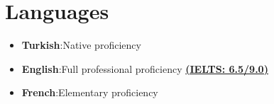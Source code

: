 \documentclass[a4paper,11pt]{article}
\newcommand{\resumeItem}[2]{
    \item{\textbf{#1}{:\hspace{0.5mm}#2 \vspace{-0.5mm}}}
}
\newcommand{\resumeSubItem}[2]{\resumeItem{#1}{#2}\vspace{-4pt}}
\newcommand{\resumeHeadingSkillStart}{\begin{itemize}[leftmargin=*,itemsep=1.7mm, rightmargin=2ex]}
\newcommand{\resumeHeadingSkillEnd}{\end{itemize}\vspace{-2mm}}
\begin{document}

\section{\textbf{Languages}}
\vspace{1.5mm}
    \resumeHeadingSkillStart
        \resumeSubItem{Turkish} {Native proficiency}
        \resumeSubItem{English} {Full professional proficiency {\href{https://drive.google.com/file/d/1jKMRSpP3VZ0Qj-F9RZ2jfN7uosiKkEt6/view}{\textbf{\color{blue}(IELTS: 6.5/9.0)}}}}
        \resumeSubItem{French} {Elementary proficiency}
    \resumeHeadingSkillEnd

\vspace{-1mm}

\end{document}
